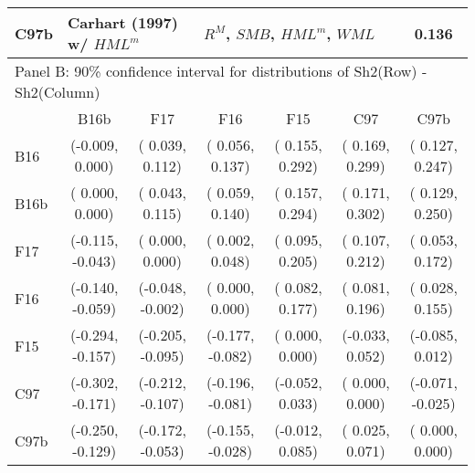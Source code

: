 \begin{table}[!ht]
\begin{tabular}{lcccccc}
  C97b  & \multicolumn{2}{l}{Carhart (1997) w/ $HML^m$}    & \multicolumn{3}{l}{$R^M$, $SMB$, $HML^m$, $WML$}               & 0.136 \\
  \midrule
  \multicolumn{7}{l}{Panel B: 90\% confidence interval for distributions of Sh2(Row) - Sh2(Column)} \\
        &        B16b      &        F17       &        F16       &        F15       &        C97       &        C97b      \\
  B16   & (-0.009,  0.000) & ( 0.039,  0.112) & ( 0.056,  0.137) & ( 0.155,  0.292) & ( 0.169,  0.299) & ( 0.127,  0.247) \\
  B16b  & ( 0.000,  0.000) & ( 0.043,  0.115) & ( 0.059,  0.140) & ( 0.157,  0.294) & ( 0.171,  0.302) & ( 0.129,  0.250) \\
  F17   & (-0.115, -0.043) & ( 0.000,  0.000) & ( 0.002,  0.048) & ( 0.095,  0.205) & ( 0.107,  0.212) & ( 0.053,  0.172) \\
  F16   & (-0.140, -0.059) & (-0.048, -0.002) & ( 0.000,  0.000) & ( 0.082,  0.177) & ( 0.081,  0.196) & ( 0.028,  0.155) \\
  F15   & (-0.294, -0.157) & (-0.205, -0.095) & (-0.177, -0.082) & ( 0.000,  0.000) & (-0.033,  0.052) & (-0.085,  0.012) \\
  C97   & (-0.302, -0.171) & (-0.212, -0.107) & (-0.196, -0.081) & (-0.052,  0.033) & ( 0.000,  0.000) & (-0.071, -0.025) \\
  C97b  & (-0.250, -0.129) & (-0.172, -0.053) & (-0.155, -0.028) & (-0.012,  0.085) & ( 0.025,  0.071) & ( 0.000,  0.000) \\
  \bottomrule
\end{tabular}
\end{table}
